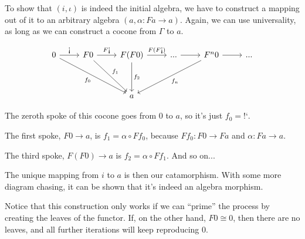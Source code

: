 \documentclass[DaoFP]{subfiles}
\begin{document}
To show that  $(i, \iota)$ is indeed the initial algebra, we have to construct a mapping out of it to an arbitrary algebra $(a, \alpha \colon F a \to a)$. Again, we can use universality, as long as we can construct a cocone from $\Gamma$ to $a$. 

\[
 \begin{tikzcd}
 0
 \arrow[r, "\mbox{!`}"]
 \arrow[ddrr, "f_0"']
 & F 0
  \arrow[r, "F\mbox{!`}"]
 \arrow[ddr, "f_1"]
& F (F 0)
  \arrow[r, "F(F\mbox{!`})"]
  \arrow[dd, "f_2"]
 & ...
 \arrow[r]
 & F^n 0
  \arrow[r]
 \arrow[ddll, "f_n"]
 & ...
 \\
 \\
 &&a
  \end{tikzcd}
\]


The zeroth spoke of this cocone goes from $0$ to $a$, so it's just $f_0 = \mbox{!`}$.

The first spoke, $F 0 \to a$, is $f_1 = \alpha \circ F f_0$, because $F f_0 \colon F 0 \to F a$ and $\alpha \colon F a \to a$.

The third spoke, $F (F 0) \to a$ is  $f_2 = \alpha \circ F f_1$.  And so on...

The unique mapping from $i$ to $a$ is then our catamorphism. With some more diagram chasing, it can be shown that it's indeed an algebra morphism. 

Notice that this construction only works if we can ``prime'' the process by creating the leaves of the functor. If, on the other hand, $F 0 \cong 0$, then there are no leaves, and all further iterations will keep reproducing $0$. 
\end{document}
